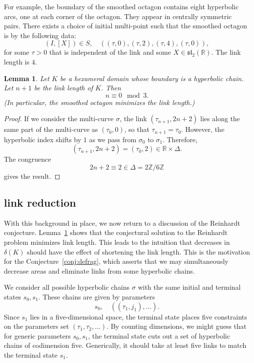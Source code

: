 \documentclass[11pt]{amsart}
\newtheorem{lemma}{Lemma}
\newcommand{\ring}[1]{\mathbb{#1}}
\def\deltalat{\mathbb\delta}  %
\def\rZ{{\ring{Z}}}
\def\rR{{\ring{R}}}
\def\ta{{\tau}}
\begin{document}
For example,
the boundary of the smoothed octagon contains
eight hyperbolic arcs, one at each corner of the octagon. They appear
in centrally symmetric pairs.
There exists a choice of initial multi-point such that the smoothed octagon is by the following data:
$$
(I,[X])\in S,\quad ((\ta,0),(\ta,2),(\ta,4),(\ta,0)),
$$
for some $\ta>0$ that is independent of the link and some
$X\in\mathfrak{sl}_2(\rR)$.
The link length is $4$.

\begin{lemma}\label{lemma:link}  Let $K$ be a hexameral domain whose boundary is
a hyperbolic chain.  Let $n+1$ be the link length of $K$.  Then
$$n\equiv 0 \mod 3.$$
(In particular, the smoothed octagon minimizes the link length.)
\end{lemma}

\begin{proof} If we consider the multi-curve $\sigma$, the link
$(\ta_{n+1},2n+2)$ lies along the same part of the multi-curve as $(\ta_0,0)$,
so that $\ta_{n+1}=\ta_0$.  However, the hyperbolic index shifts by
$1$ as we pass from $\sigma_0$ to $\sigma_1$.  Therefore,
$$(\ta_{n+1},2n+2) = (\ta_0,2)\in \rR\times \Delta.$$
The congruence $$2n+2 \equiv 2\in \Delta = 2\rZ/6\rZ$$
gives the result.
\end{proof}

\subsection{link reduction}

With this background in place, we now return to a discussion of the
Reinhardt conjecture.  Lemma~\ref{lemma:link} shows that the
conjectural solution to the Reinhardt problem minimizes link
length.  This leads to the intuition 
that decreases in $\deltalat(K)$ should have
the effect of shortening the link length.  This is the motivation
for the Conjecture~\ref{conj:defrag}, which asserts that we may
simultaneously decrease areas and eliminate links
from some hyperbolic chains.   

We consider all possible hyperbolic chains $\sigma$ with the same
initial and terminal states $s_0,s_1$.  These chains are given by
parameters
  $$
  s_0,\quad ((\ta_1,j_1),\ldots).
  $$
Since $s_1$ lies in a five-dimensional space, the terminal state
places five constraints on the parameters set $(\ta_1,\ta_2,\ldots)$.  
By counting dimensions, we
might guess that for generic parameters $s_0,s_1$, the terminal
state cuts out a set of hyperbolic chains of codimension five.
Generically, it should take at least five links to match the terminal state $s_1$.
\end{document}
